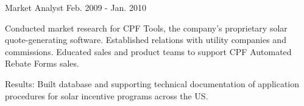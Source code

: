 \begin{cventries}
\cventry
{Market Analyst} %
{} %
{} %
{Feb. 2009 - Jan. 2010} %
{ %
\begin{cvitems}
\item {Conducted market research for CPF Tools, the company’s proprietary solar quote-generating software. Established relations with utility companies and commissions. Educated sales and product teams to support CPF Automated Rebate Forms sales.}
\end{cvitems}
}
\begin{cvitemsnb}
\item {Results: Built database and supporting technical documentation of application procedures for solar incentive programs across the US.}
\end{cvitemsnb}	


\end{cventries}